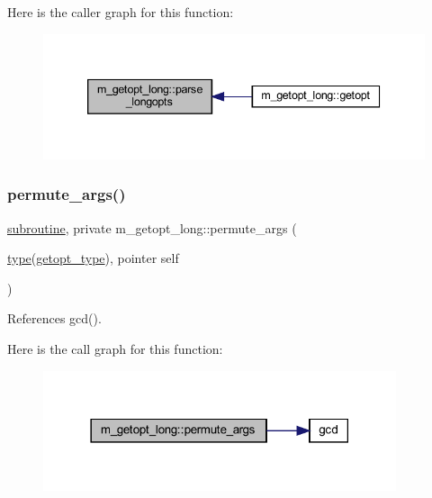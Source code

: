 Here is the caller graph for this function\+:
\nopagebreak
\begin{figure}[H]
\begin{center}
\leavevmode
\includegraphics[width=339pt]{namespacem__getopt__long_a7bad6d8d4067d578429da9282bc82ada_icgraph}
\end{center}
\end{figure}
\mbox{\label{namespacem__getopt__long_a55045492836fd218379126cbdcee24ea}} 
\subsubsection{\texorpdfstring{permute\+\_\+args()}{permute\_args()}}
{\footnotesize\ttfamily \hyperlink{M__stopwatch_83_8txt_acfbcff50169d691ff02d4a123ed70482}{subroutine}, private m\+\_\+getopt\+\_\+long\+::permute\+\_\+args (\begin{DoxyParamCaption}\item[{\hyperlink{stop__watch_83_8txt_a70f0ead91c32e25323c03265aa302c1c}{type}(\hyperlink{structm__getopt__long_1_1getopt__type}{getopt\+\_\+type}), pointer}]{self }\end{DoxyParamCaption})\hspace{0.3cm}{\ttfamily [private]}}



References gcd().

Here is the call graph for this function\+:
\nopagebreak
\begin{figure}[H]
\begin{center}
\leavevmode
\includegraphics[width=294pt]{namespacem__getopt__long_a55045492836fd218379126cbdcee24ea_cgraph}
\end{center}
\end{figure}
\mbox{\label{namespacem__getopt__long_af1ccef432aa194687e03575a68537553}} 
